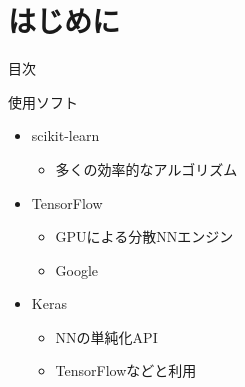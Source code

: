\documentclass[aspectratio=169, dvipdfmx, 14pt, xcolor={svgnames,dvipsnames}]{beamer}
\def\tightlist{\itemsep1pt\parskip0pt\parsep0pt}
\begin{document}

\section{はじめに}
\begin{frame}{目次}
  \tableofcontents[currentsection]
\end{frame}


\begin{frame}{使用ソフト}
  \begin{itemize}
    \tightlist
    \item
          scikit-learn

          \begin{itemize}
            \tightlist
            \item
                  多くの効率的なアルゴリズム
          \end{itemize}
    \item
          TensorFlow

          \begin{itemize}
            \tightlist
            \item
                  GPUによる分散NNエンジン
            \item
                  Google
          \end{itemize}
    \item
          Keras

          \begin{itemize}
            \tightlist
            \item
                  NNの単純化API
            \item
                  TensorFlowなどと利用
          \end{itemize}
  \end{itemize}
\end{frame}
\end{document}
